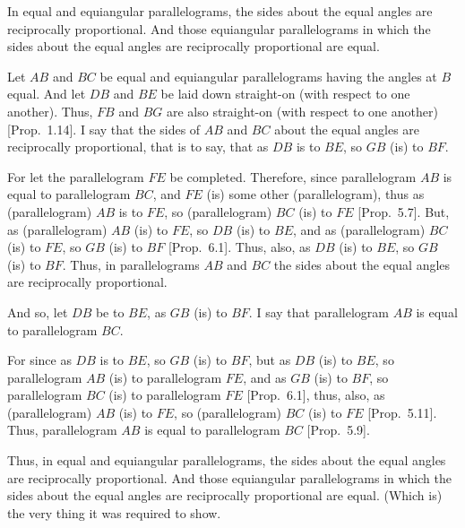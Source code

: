 \begin{Parallel}{}{}
{In equal and equiangular parallelograms, the
sides about the equal angles are reciprocally proportional. And those
equiangular parallelograms in which  the sides about the equal
angles are reciprocally proportional are equal.

Let $AB$ and $BC$ be equal and equiangular parallelograms having the angles
at $B$ equal. And let $DB$ and $BE$ be laid down straight-on (with respect to one
another). Thus, $FB$ and $BG$ are also straight-on (with respect to one another)  [Prop.~1.14].
I say that the sides of $AB$ and $BC$ about the equal angles
are reciprocally proportional, that is to say, that as $DB$ is to $BE$,
so $GB$ (is) to $BF$.

\epsfysize=2.2in
\centerline{}

For let the parallelogram $FE$ be completed. Therefore, since parallelogram $AB$ is equal to parallelogram $BC$, and $FE$ (is) some
other (parallelogram), thus as (parallelogram) $AB$ is to $FE$, so (parallelogram) $BC$ (is) to $FE$ [Prop.~5.7]. But, as (parallelogram) $AB$ (is) to $FE$, so $DB$
(is) to $BE$, and as (parallelogram) $BC$ (is) to $FE$, so $GB$ (is) to $BF$ [Prop.~6.1]. Thus, also, as $DB$ (is) to
$BE$, so $GB$ (is) to $BF$. Thus, in parallelograms $AB$ and $BC$
the sides about the equal angles are reciprocally proportional.

And so, let $DB$ be to $BE$, as $GB$ (is) to $BF$. I say that parallelogram
$AB$ is equal to parallelogram $BC$.

For since as $DB$ is to $BE$, so $GB$ (is) to $BF$, but as $DB$ (is) to $BE$, so
parallelogram $AB$ (is) to parallelogram $FE$, and as $GB$ (is) to $BF$,
so parallelogram $BC$ (is) to parallelogram $FE$  [Prop.~6.1], thus, also, as (parallelogram) $AB$ (is)
to $FE$, so (parallelogram) $BC$ (is) to $FE$ [Prop.~5.11].
Thus,  parallelogram $AB$ is equal to parallelogram $BC$ [Prop.~5.9].

Thus, in equal and equiangular parallelograms, the
sides about the equal angles are reciprocally proportional. And those
equiangular parallelograms in which the sides about the equal
angles are reciprocally proportional are equal. (Which is) the very thing
it was required to show.}
\end{Parallel}


